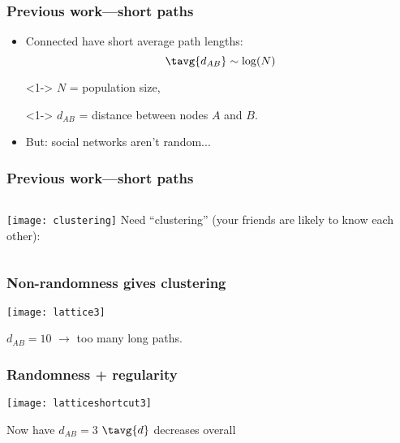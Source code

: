 \begin{frame}
  \frametitle{Previous work---short paths}
  
  \begin{itemize}
  \item<1->
    Connected 
    have short average path lengths:
    $$\tavg{d_{AB}} \sim \log(N)$$
  \item[]<1->
    $N$ = population size,
  \item[]<1->
    $d_{AB}$ = distance between nodes $A$ and $B$.
  \item<2->
  \alert{But: social networks aren't random...}
  \end{itemize}


\end{frame}


\begin{frame}
  \frametitle{Previous work---short paths}

  \begin{columns}
    \texttt{[image: clustering]}
    Need \alert{``clustering''} (your friends are likely to know each other):
  \end{columns}

\end{frame}


\begin{frame}
  \frametitle{Non-randomness gives clustering}

  \begin{center}
    \texttt{[image: lattice3]}
  \end{center}

  $d_{AB}=10$ $\rightarrow$ too many long paths.

\end{frame}

\begin{frame}
  \frametitle{Randomness + regularity}

  \begin{center}
    \texttt{[image: latticeshortcut3]}
  \end{center}

  \alert{Now have $d_{AB}=3$}
  \hfill $\tavg{d}$ decreases overall
\end{frame}

